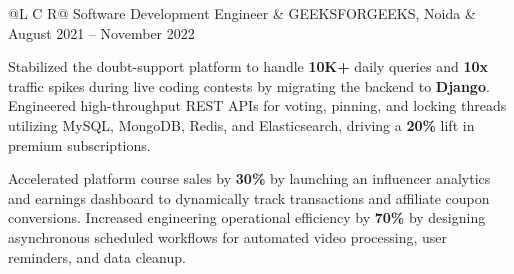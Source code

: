 \noindent
\begin{tabularx}{\textwidth}{@{}L C R@{}}
\textcolor{role}{Software Development Engineer} & \textcolor{company}{GEEKSFORGEEKS, Noida} & \textcolor{date}{August 2021 -- November 2022}\\
\end{tabularx}
\vspace{-1.8ex}
\begin{zitemize}
    \item Stabilized the doubt-support platform to handle \textbf{10K+} daily queries and \textbf{10x} traffic spikes during live coding contests by migrating the backend to \textbf{Django}. Engineered high-throughput REST APIs for voting, pinning, and locking threads utilizing MySQL, MongoDB, Redis, and Elasticsearch, driving a \textbf{20\%} lift in premium subscriptions.
    \item Accelerated platform course sales by \textbf{30\%} by launching an influencer analytics and earnings dashboard to dynamically track transactions and affiliate coupon conversions. Increased engineering operational efficiency by \textbf{70\%} by designing asynchronous scheduled workflows for automated video processing, user reminders, and data cleanup.
\end{zitemize}
